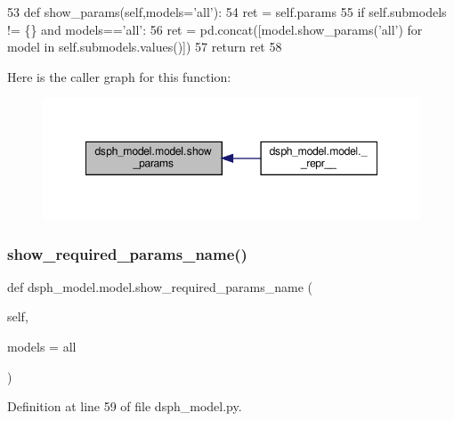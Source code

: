 \begin{DoxyCode}
53     \textcolor{keyword}{def }show\_params(self,models='all'):
54         ret = self.params
55         \textcolor{keywordflow}{if} self.submodels != \{\} \textcolor{keywordflow}{and} models==\textcolor{stringliteral}{'all'}:
56             ret = pd.concat([model.show\_params(\textcolor{stringliteral}{'all'}) \textcolor{keywordflow}{for} model \textcolor{keywordflow}{in} self.submodels.values()])
57         \textcolor{keywordflow}{return} ret
58 
\end{DoxyCode}
Here is the caller graph for this function\+:\nopagebreak
\begin{figure}[H]
\begin{center}
\leavevmode
\includegraphics[width=348pt]{d3/da3/classdsph__model_1_1model_a44b8bf302a0786eb9a492a904213f977_icgraph}
\end{center}
\end{figure}
\mbox{\label{classdsph__model_1_1model_a399541f174c45f4f640f7fcbeed99e00}} 
\subsubsection{\texorpdfstring{show\+\_\+required\+\_\+params\+\_\+name()}{show\_required\_params\_name()}}
{\footnotesize\ttfamily def dsph\+\_\+model.\+model.\+show\+\_\+required\+\_\+params\+\_\+name (\begin{DoxyParamCaption}\item[{}]{self,  }\item[{}]{models = {\ttfamily \textquotesingle{}all\textquotesingle{}} }\end{DoxyParamCaption})}



Definition at line 59 of file dsph\+\_\+model.\+py.


